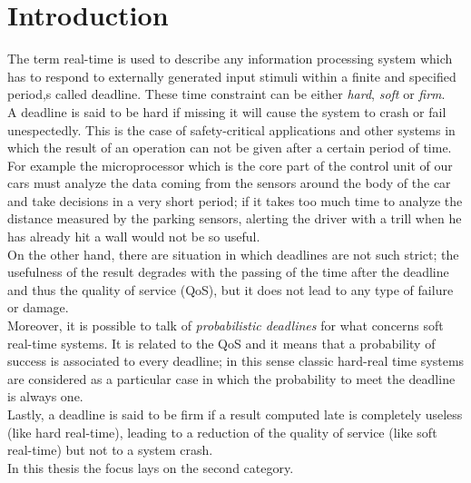 \chapter{Introduction}\label{chp:introduction}
The term real-time is used to describe any information processing system which has to respond to externally generated input stimuli within a finite and specified period,s called deadline.
These time constraint can be either \emph{hard}, \emph{soft} or \emph{firm}.\\
A deadline is said to be hard if missing it will cause the system to crash or fail unespectedly. This is the case of safety-critical applications and other systems in which the result of an operation can not be given after a certain period of time.\\
For example the microprocessor which is the core part of the control unit of our cars must analyze the data coming from the sensors around the body of the car and take decisions in a very short period; if it takes too much time to analyze the distance measured by the parking sensors, alerting the driver with a trill when he has already hit a wall would not be so useful.\\
On the other hand, there are situation in which deadlines are not such strict; the usefulness of the result degrades with the passing of the time after the deadline and thus the quality of service (QoS), but it does not lead to any type of failure or damage.\\
Moreover, it is possible to talk of \emph{probabilistic deadlines} for what concerns soft real-time systems. It is related to the QoS and it means that a probability of success is associated to every deadline; in this sense classic hard-real time systems are considered as a particular case in which the probability to meet the deadline is always one.\\ 
Lastly, a deadline is said to be firm if a result computed late is completely useless (like hard real-time), leading to a reduction of the quality of service (like soft real-time) but not to a system crash.\\
In this thesis the focus lays on the second category.